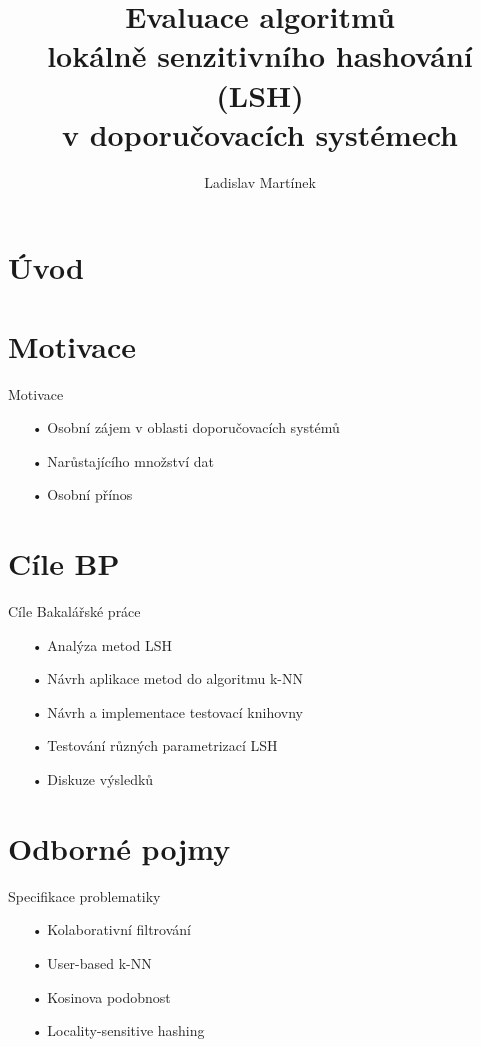 \documentclass[aspectratio=169,28pt]{beamer}
\title{Evaluace algoritmů\\ lokálně senzitivního hashování (LSH)\\ v doporučovacích systémech}
\author{Ladislav Martínek}
\begin{document}
\section{Úvod}
\begin{frame}
\titlepage
\end{frame}

\section{Motivace}
\begin{frame}{Motivace}
		\begin{itemize}
		\item[•] Osobní zájem v oblasti doporučovacích systémů
		\item[•] Narůstajícího množství dat
		\item[•] Osobní přínos
		\end{itemize}
\end{frame}

\section{Cíle BP}
\begin{frame}{Cíle Bakalářské práce}
       \begin{itemize}
		\item[•] Analýza metod LSH 
		\item[•] Návrh aplikace metod do algoritmu k-NN 
		\item[•] Návrh a implementace testovací knihovny
		\item[•] Testování různých parametrizací LSH
		\item[•] Diskuze výsledků
		\end{itemize}
\end{frame}

\section{Odborné pojmy}
\begin{frame}{Specifikace problematiky}
		\begin{itemize}
		\item[•] Kolaborativní filtrování
		\item[•] User-based k-NN
		\item[•] Kosinova podobnost
		\item[•] Locality-sensitive hashing
		\end{itemize}
\end{frame}
\end{document}
